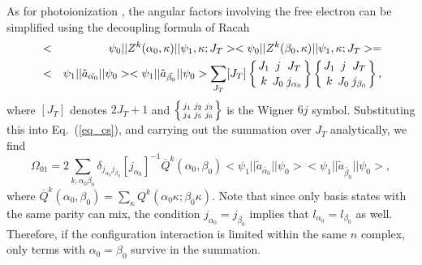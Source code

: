 \documentclass[preprint, floatfix, pra, showpacs, showkeys]{revtex4}
\newcommand{\sixj}[6]{\ensuremath{\left\{{#1\atop #4}{#2\atop #5}
{#3\atop #6}\right\}}}
\begin{document}
As for photoionization \cite{gu02b}, the angular factors involving the free
electron can be simplified using the decoupling formula of Racah
\begin{eqnarray}
&<&\psi_0||Z^k(\alpha_0, \kappa)||\psi_1,\kappa;J_T>
<\psi_0||Z^k(\beta_0, \kappa)||\psi_1,\kappa;J_T> = \nonumber\\*
&<&\psi_1||\tilde{a}_{\tilde{\alpha_0}}||\psi_0>
<\psi_1||\tilde{a}_{\tilde{\beta_0}}||\psi_0>
\sum_{J_T}[J_T]\sixj{J_1}{j}{J_T}{k}{J_0}{j_{\alpha_0}}
\sixj{J_1}{j}{J_T}{k}{J_0}{j_{\beta_0}},
\end{eqnarray}
where $[J_T]$ denotes $2J_T+1$ and $\sixj{j_1}{j_2}{j_3}{j_4}{j_5}{j_6}$ is
the Wigner $6j$ symbol. 
Substituting this into Eq.~(\ref{eq_cs}), and carrying
out the summation over $J_T$ analytically, we find
\begin{equation}
\label{eq_scs}
\Omega_{01} = 2\sum_{k,\alpha_0\beta_0}
\delta_{j_{\alpha_0}j_{\beta_0}}[j_{\alpha_0}]^{-1} 
\overline{Q}^k(\alpha_0,\beta_0)
<\psi_1||\tilde{a}_{\tilde{\alpha_0}}||\psi_0>
<\psi_1||\tilde{a}_{\tilde{\beta_0}}||\psi_0>,
\end{equation}
where $\overline{Q}^k(\alpha_0,\beta_0) = \sum_\kappa
Q^k(\alpha_0\kappa;\beta_0\kappa)$.
Note that since only basis states with the same parity can mix, the condition
$j_{\alpha_0}=j_{\beta_0}$ implies that $l_{\alpha_0} = l_{\beta_0}$ as
well. Therefore, if the configuration interaction is limited within the same
$n$ complex, only terms with $\alpha_0 = \beta_0$ survive in the summation. 
\end{document}
